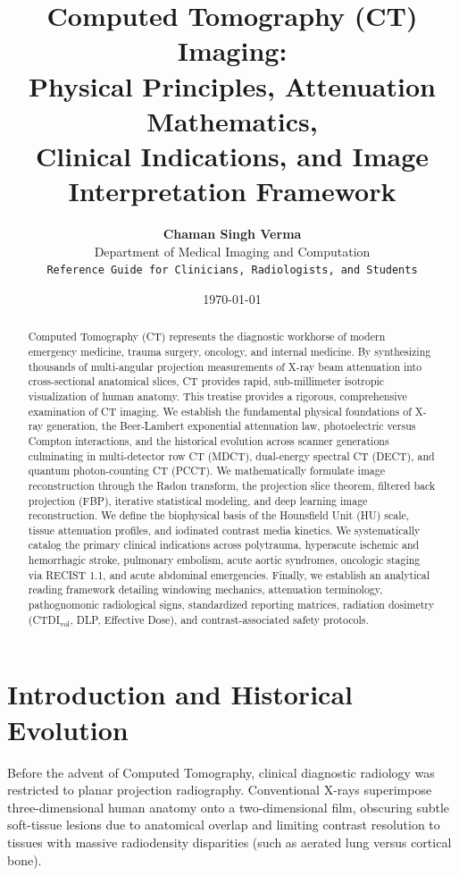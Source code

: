 \documentclass[11pt,a4paper]{article}
\title{\textbf{\huge Computed Tomography (CT) Imaging:}\\[0.3em]
\Large Physical Principles, Attenuation Mathematics,\\
Clinical Indications, and Image Interpretation Framework}
\author{\textbf{Chaman Singh Verma}\\[0.2em]
\small Department of Medical Imaging and Computation\\
\small \texttt{Reference Guide for Clinicians, Radiologists, and Students}}
\date{\today}
\begin{document}
\maketitle

\begin{abstract}
Computed Tomography (CT) represents the diagnostic workhorse of modern emergency medicine, trauma surgery, oncology, and internal medicine. By synthesizing thousands of multi-angular projection measurements of X-ray beam attenuation into cross-sectional anatomical slices, CT provides rapid, sub-millimeter isotropic visualization of human anatomy. This treatise provides a rigorous, comprehensive examination of CT imaging. We establish the fundamental physical foundations of X-ray generation, the Beer-Lambert exponential attenuation law, photoelectric versus Compton interactions, and the historical evolution across scanner generations culminating in multi-detector row CT (MDCT), dual-energy spectral CT (DECT), and quantum photon-counting CT (PCCT). We mathematically formulate image reconstruction through the Radon transform, the projection slice theorem, filtered back projection (FBP), iterative statistical modeling, and deep learning image reconstruction. We define the biophysical basis of the Hounsfield Unit (HU) scale, tissue attenuation profiles, and iodinated contrast media kinetics. We systematically catalog the primary clinical indications across polytrauma, hyperacute ischemic and hemorrhagic stroke, pulmonary embolism, acute aortic syndromes, oncologic staging via RECIST 1.1, and acute abdominal emergencies. Finally, we establish an analytical reading framework detailing windowing mechanics, attenuation terminology, pathognomonic radiological signs, standardized reporting matrices, radiation dosimetry (CTDI$_{\text{vol}}$, DLP, Effective Dose), and contrast-associated safety protocols.
\end{abstract}

\tableofcontents
\newpage

\section{Introduction and Historical Evolution}

Before the advent of Computed Tomography, clinical diagnostic radiology was restricted to planar projection radiography. Conventional X-rays superimpose three-dimensional human anatomy onto a two-dimensional film, obscuring subtle soft-tissue lesions due to anatomical overlap and limiting contrast resolution to tissues with massive radiodensity disparities (such as aerated lung versus cortical bone).
\end{document}
